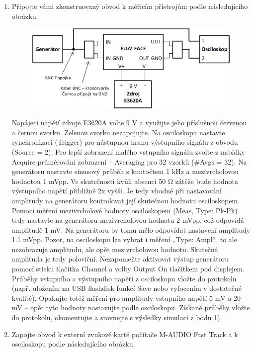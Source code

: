 \documentclass[a4paper, czech]{article}
\begin{document}
\begin{enumerate}
    \pagebreak
    \item Připojte vámi zkonstruovaný obvod k měřicím přístrojům podle následujícího obrázku.
    \begin{figure}[H]
        \centering
        \includegraphics{ukoly_obrazek_1.png}
    \end{figure}
    Napájecí napětí zdroje E3620A volte 9 V a využijte jeho příslušnou červenou a černou svorku. Zelenou svorku nezapojujte. Na osciloskopu nastavte synchronizaci (Trigger) pro nástupnou hranu výstupního signálu z obvodu (Source = 2). Pro lepší zobrazení malého vstupního signálu zvolte z nabídky Acquire průměrování zobrazení – Averaging pro 32 vzorků (\#Avgs = 32). Na generátoru nastavte sinusový průběh s kmitočtem 1 kHz a mezivrcholovou hodnotou 1 mVpp. Ve skutečnosti kvůli absenci 50 Ω zátěže bude hodnota výstupního napětí přibližně 2x vyšší. Je tedy vhodné při nastavování amplitudy na generátoru kontrolovat její skutečnou hodnotu osciloskopem. Pomocí měření mezivrcholové hodnoty osciloskopem (Meas, Type: Pk-Pk) tedy nastavte na generátoru mezivrcholovou hodnotu 2 mVpp, což odpovídá amplitudě 1 mV. Na generátoru by tomu mělo odpovídat nastavení amplitudy 1.1 mVpp. Pozor, na osciloskopu lze vybrat i měření „Type: Ampl“, to ale nezobrazuje amplitudu, ale opět mezivrcholovou hodnotu. Skutečná amplituda je tedy poloviční. Nezapomeňte aktivovat výstup generátoru pomocí stisku tlačítka Channel a volby Output On tlačítkem pod displejem. Průběhy vstupního a výstupního napětí z osciloskopu vložte do protokolu (např. uložením na USB flashdisk funkcí Save nebo vyfocením v dostatečné kvalitě). Opakujte totéž měření pro amplitudy vstupního napětí 5 mV a 20 mV – opět tyto hodnoty nastavujte podle osciloskopu. Získané průběhy vložte do protokolu, okomentujte a srovnejte s výsledky simulací z bodu 1).
    \item Zapojte obvod k externí zvukové kartě počítače M-AUDIO Fast Track a k osciloskopu podle následujícího obrázku.

\end{enumerate}
\end{document}
